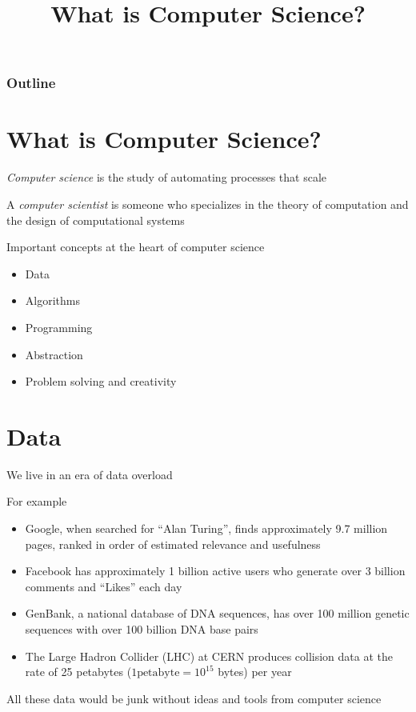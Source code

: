 \documentclass[8pt,a4paper,compress]{beamer}
\title{What is Computer Science?}
\date{}
\begin{document}
\begin{frame}
\vfill
\titlepage
\end{frame}

\begin{frame}
\frametitle{Outline}
\tableofcontents
\end{frame}

\section{What is Computer Science?}
\begin{frame}[fragile]
\emph{Computer science} is the study of automating processes that scale

\bigskip

A \emph{computer scientist} is someone who specializes in the theory of computation and the design of computational systems

\bigskip

Important concepts at the heart of computer science
\begin{itemize}
\item Data
\item Algorithms
\item Programming
\item Abstraction
\item Problem solving and creativity
\end{itemize}
\end{frame}

\section{Data}
\begin{frame}[fragile]
We live in an era of data overload

\bigskip

For example
\begin{itemize}
\item Google, when searched for ``Alan Turing'', finds approximately 9.7 million pages, ranked in order of estimated relevance and usefulness 
\item Facebook has approximately 1 billion active users who generate over 3 billion comments and ``Likes'' each day 
\item GenBank, a national database of DNA sequences, has over 100 million genetic sequences with over 100 billion DNA base pairs 
\item The Large Hadron Collider (LHC) at CERN produces collision data at the rate of 25 petabytes ($1 \text{petabyte} = 10^{15}$ bytes) per year
\end{itemize}

\bigskip

All these data would be junk without ideas and tools from computer science
\end{frame}
\end{document}
